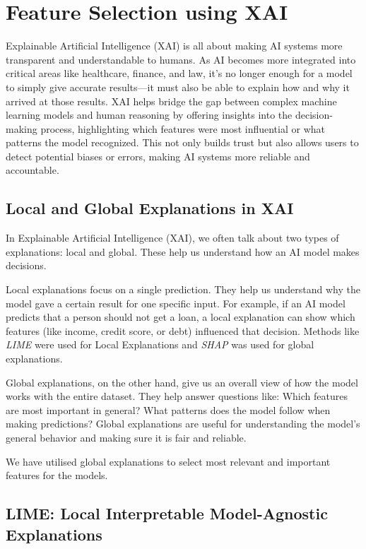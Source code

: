 \documentclass[conference,letterpaper]{IEEEtran}
\begin{document}

\section{Feature Selection using XAI}
Explainable Artificial Intelligence (XAI) is all about making AI systems more transparent and understandable to humans. As AI becomes more integrated into critical areas like healthcare, finance, and law, it's no longer enough for a model to simply give accurate results—it must also be able to explain how and why it arrived at those results. XAI helps bridge the gap between complex machine learning models and human reasoning by offering insights into the decision-making process, highlighting which features were most influential or what patterns the model recognized. This not only builds trust but also allows users to detect potential biases or errors, making AI systems more reliable and accountable.
\subsection*{Local and Global Explanations in XAI}

In Explainable Artificial Intelligence (XAI), we often talk about two types of explanations: {local} and {global}. These help us understand how an AI model makes decisions.

{Local explanations} focus on a single prediction. They help us understand why the model gave a certain result for one specific input. For example, if an AI model predicts that a person should not get a loan, a local explanation can show which features (like income, credit score, or debt) influenced that decision. Methods like \textit{LIME} were used for Local Explanations and \textit{SHAP} was used for global explanations.

{Global explanations}, on the other hand, give us an overall view of how the model works with the entire dataset. They help answer questions like: Which features are most important in general? What patterns does the model follow when making predictions? Global explanations are useful for understanding the model’s general behavior and making sure it is fair and reliable.

We have utilised global explanations to select most relevant and important features for the models. 
\subsection*{LIME: Local Interpretable Model-Agnostic Explanations}
\end{document}
